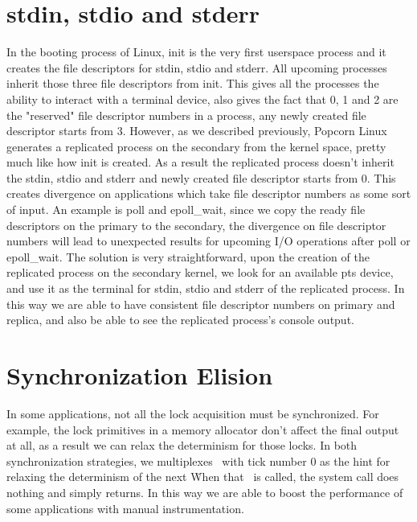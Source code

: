 \section{stdin, stdio and stderr} \label{sec:stdxxx}

In the booting process of Linux, init is the very first userspace process and it creates the file descriptors for stdin, stdio and stderr. All upcoming processes inherit those three file descriptors from init. This gives all the processes the ability to interact with a terminal device, also gives the fact that 0, 1 and 2 are the "reserved" file descriptor numbers in a process, any newly created file descriptor starts from 3. However, as we described previously, Popcorn Linux generates a replicated process on the secondary from the kernel space, pretty much like how init is created. As a result the replicated process doesn't inherit the stdin, stdio and stderr and newly created file descriptor starts from 0. This creates divergence on applications which take file descriptor numbers as some sort of input. An example is poll and epoll\_wait, since we copy the ready file descriptors on the primary to the secondary, the divergence on file descriptor numbers will lead to unexpected results for upcoming I/O operations after poll or epoll\_wait. The solution is very straightforward, upon the creation of the replicated process on the secondary kernel, we look for an available pts device, and  use it as the terminal for stdin, stdio and stderr of the replicated process. In this way we are able to have consistent file descriptor numbers on primary and replica, and also be able to see the replicated process's console output.

\section{Synchronization Elision} \label{sec:elision}
In some applications, not all the lock acquisition must be synchronized. For example, the lock primitives in a memory allocator don't affect the final output at all, as a result we can relax the determinism for those locks. In both synchronization strategies, we multiplexes \dettick\ with tick number 0 as the hint for relaxing the determinism of the next \detstart\. When that \detstart\ is called, the system call does nothing and simply returns. In this way we are able to boost the performance of some applications with manual instrumentation.